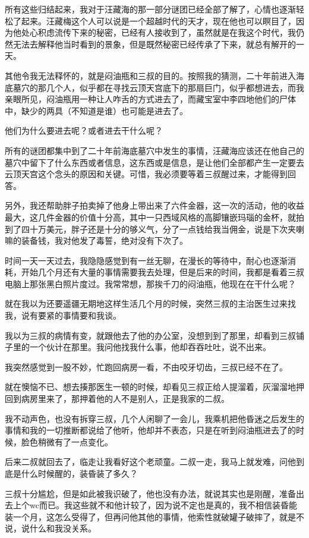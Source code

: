 所有这些归结起来，我对于汪藏海的那一部分谜团已经全部了解了，心情也逐渐轻松了起来。汪藏梅这个人可以说是一个超越时代的天才，现在他也可以瞑目了，因为他处心积虑流传下来的秘密，已经有人接收到了，虽然就是在我这个时代，我仍然无法去解释他当时看到的景象，但是既然秘密已经传承了下来，就总有解开的一天。

其他令我无法释怀的，就是闷油瓶和三叔的目的。按照我的猜测，二十年前进入海底墓穴的那几个人，似乎都在寻找云顶天宫底下的那扇巨门，似乎都想进去，而我亲眼所见，闷油瓶用一种让人咋舌的方式进去了，而藏宝室中李四地他们的尸体中，缺少的两具（不知道是谁）也可能是进去了。

他们为什么要进去呢？或者进去干什么呢？

所有的谜团都集中到了二十年前海底墓穴中发生的事情，汪藏海应该还在他自己的墓穴中留下了什么东西或者信息，这东西或是信息，是让他们全部都产生一定要去云顶天宫这个念头的原因和关键。可惜，我必须要等着三叔醒过来，才能得到回答。

另外，我还帮助胖子拍卖掉了他身上带出来了六件金器，这一次的活动，他的收益最大，这几件金器的价值十分高，其中一只西域风格的高脚镶嵌玛瑙的金杯，就拍到了四十万美元，胖子还是十分的够义气，分了一点钱给我当佣金，说是下次夹喇嘛的装备钱，我对他发了毒誓，绝对没有下次了。

时间一天一天过去，我隐隐感觉到有一丝无聊，在漫长的等待中，耐心也逐渐消耗，开始几个月还有大量的事情需要我去处理，但是后来的时间，我都是看着三叔电脑上那张黑白照片度过。我常常想，那挨千刀的闷油瓶，他现在在干什么呢？

就在我以为还要遥疆无期地这样生活几个月的时候，突然三叔的主治医生过来找我，说有要紧的事情要和我谈。

我以为三叔的病情有变，就跟他去了他的办公室，没想到到了那里，却看到三叔铺子里的一个伙计在那里。我问他找我什么事，他却吞吞吐吐，说不出来。

我突然感觉到一股不妙，忙跑回病房一看，不由咬牙切齿，三叔已经不在了。

就在懊恼不已、想去揍那医生一顿的时候，却看见三叔正给人提溜着，灰溜溜地押回到病房里来了，那押着他的人不是别人，正是我家的二叔。

我不动声色，也没有拆穿三叔，几个人闲聊了一会儿，我乘机把他昏迷之后发生的事情和我的一切推断都说给了他听，他却并不表态，只是在听到闷油瓶进去了的时候，脸色稍微有了一点变化。

后来二叔就回去了，临走让我看好这个老顽童。二叔一走，我马上就发难，问他到底是什么时候醒的，装昏装了多久？

三叔十分尴尬，但是如此被我识破了，他也没有办法，就说其实也是刚醒，准备出去上个wc而已。我这些就不和他计较了，因为说不定也是真的，我不相信装昏能装一个月，这怎么受得了，但再问他其他的事情，他索性就破罐子破摔了，就是不说，说什么和我没关系。

